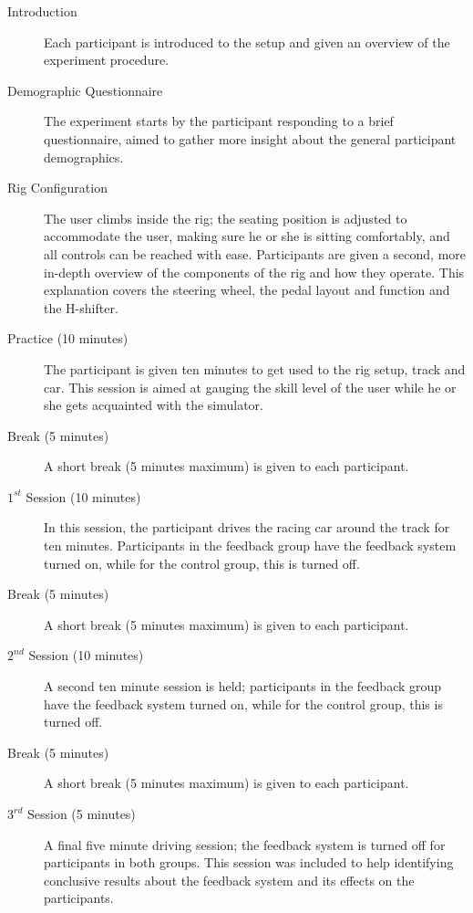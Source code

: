 \begin{description}
	\item[Introduction] Each participant is introduced to the setup and given an overview of the experiment procedure. 

	\item[Demographic Questionnaire] The experiment starts by the participant responding to a brief questionnaire, aimed to gather more insight about the general participant demographics.
	
	\item[Rig Configuration] 
	The user climbs inside the rig; the seating position is adjusted to accommodate the user, making sure he or she is sitting comfortably, and all controls can be reached with ease. Participants are given a second, more in-depth overview of the components of the rig and how they operate. This explanation covers the steering wheel, the pedal layout and function and the H-shifter.
	
	\item[Practice (10 minutes)] The participant is given ten minutes to get used to the rig setup, track and car. This session is aimed at gauging the skill level of the user while he or she gets acquainted with the simulator.
	
	\item[Break (5 minutes)] A short break (5 minutes maximum) is given to each participant.
	
	\item[$1^{st}$ Session (10 minutes)] In this session, the participant drives the racing car around the track for ten minutes. Participants in the feedback group have the feedback system turned on, while for the control group, this is turned off.
	
	\item[Break (5 minutes)] A short break (5 minutes maximum) is given to each participant.

	\item[$2^{nd}$ Session (10 minutes)] A second ten minute session is held; participants in the feedback group have the feedback system turned on, while for the control group, this is turned off.
	
	\item[Break (5 minutes)] A short break (5 minutes maximum) is given to each participant.
	
	\item[$3^{rd}$ Session (5 minutes)] A final five minute driving session; the feedback system is turned off for participants in both groups. This session was included to help identifying conclusive results about the feedback system and its effects on the participants. 
	

\end{description}
